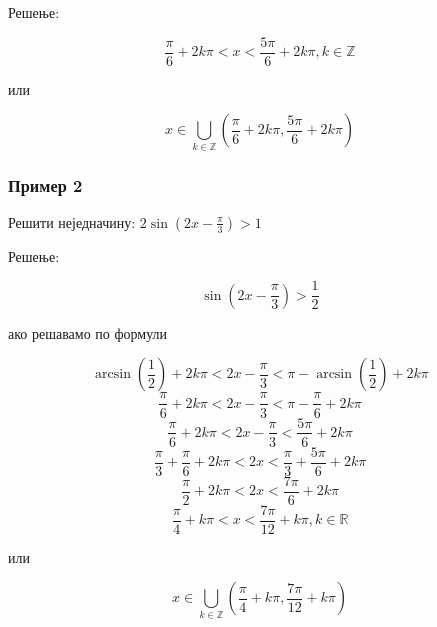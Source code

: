 \documentclass[../diplomski.tex]{subfiles}
\begin{document}


Решење:

\[\frac{\pi}{6}+2k\pi<x<\frac{5\pi}{6}+2k\pi,k\in\mathbb{Z}\]
\centerline{или}
\[x\in\bigcup_{k\in\mathbb{Z}}\left(\frac{\pi}{6}+2k\pi,\frac{5\pi}{6}+2k\pi\right)\]


\subsubsection{Пример 2}

Решити неједначину: $2\sin(2x-\frac{\pi}{3})>1$

Решење:

\[\sin(2x-\frac{\pi}{3})>\frac{1}{2}\]

ако решавамо по формули

\[\arcsin\left(\frac{1}{2}\right)+2k\pi<2x-\frac{\pi}{3}<\pi-\arcsin\left(\frac{1}{2}\right)+2k\pi\]
\[\frac{\pi}{6}+2k\pi<2x-\frac{\pi}{3}<\pi-\frac{\pi}{6}+2k\pi\]
\[\frac{\pi}{6}+2k\pi<2x-\frac{\pi}{3}<\frac{5\pi}{6}+2k\pi\]
\[\frac{\pi}{3}+\frac{\pi}{6}+2k\pi<2x<\frac{\pi}{3}+\frac{5\pi}{6}+2k\pi\]
\[\frac{\pi}{2}+2k\pi<2x<\frac{7\pi}{6}+2k\pi\]
\[\frac{\pi}{4}+k\pi<x<\frac{7\pi}{12}+k\pi,k\in\mathbb{R}\]
\centerline{или}
\[x\in\bigcup_{k\in\mathbb{Z}}(\frac{\pi}{4}+k\pi,\frac{7\pi}{12}+k\pi)\]
\end{document}
